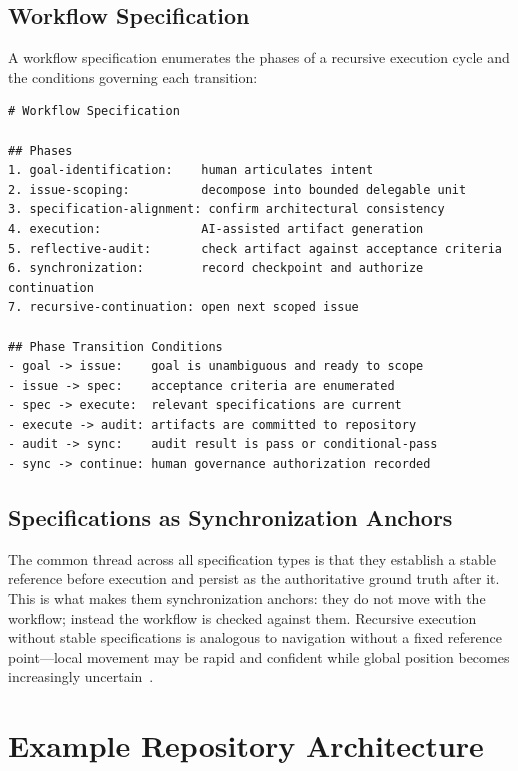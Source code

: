 \subsection{Workflow Specification}

A workflow specification enumerates the phases of a recursive execution cycle and the conditions governing each transition:

\begin{lstlisting}[caption={Workflow specification structure.}, label={lst:workflow-spec}]
# Workflow Specification

## Phases
1. goal-identification:    human articulates intent
2. issue-scoping:          decompose into bounded delegable unit
3. specification-alignment: confirm architectural consistency
4. execution:              AI-assisted artifact generation
5. reflective-audit:       check artifact against acceptance criteria
6. synchronization:        record checkpoint and authorize continuation
7. recursive-continuation: open next scoped issue

## Phase Transition Conditions
- goal -> issue:    goal is unambiguous and ready to scope
- issue -> spec:    acceptance criteria are enumerated
- spec -> execute:  relevant specifications are current
- execute -> audit: artifacts are committed to repository
- audit -> sync:    audit result is pass or conditional-pass
- sync -> continue: human governance authorization recorded
\end{lstlisting}

\subsection{Specifications as Synchronization Anchors}

The common thread across all specification types is that they establish a stable reference before execution and persist as the authoritative ground truth after it. This is what makes them synchronization anchors: they do not move with the workflow; instead the workflow is checked against them. Recursive execution without stable specifications is analogous to navigation without a fixed reference point---local movement may be rapid and confident while global position becomes increasingly uncertain~\cite{Hutchins1995CognitionWild}.


\section{Example Repository Architecture}
\label{sec:appendix-repository}

